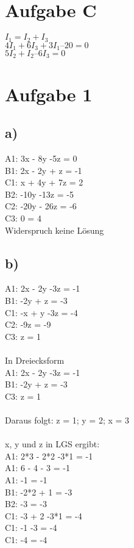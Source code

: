 \documentclass{article}
\begin{document}
	\section*{Aufgabe C}
	$I_1 = I_2 + I_3$ \\
	$4I_1 + 6I_3 + 3I_1 – 20 = 0$ \\
	$5I_2 + I_2 – 6I_3 = 0$ \\
	
	\section*{Aufgabe 1}
	\subsection*{a)}
	A1: 3x - 8y -5z = 0 \\
	B1: 2x - 2y + z = -1 \\
	C1: x + 4y + 7z = 2 \\
	B2: -10y -13z = -5 \\
	C2: -20y - 26z = -6 \\
	C3: 0 = 4 \\
	Widerspruch keine Lösung
	
	\subsection*{b)}
	A1: 2x - 2y -3z = -1 \\
	B1: -2y + z = -3\\
	C1: -x + y -3z = -4\\
	C2: -9z = -9 \\
	C3: z = 1 \\ \\
	In Dreiecksform \\
	A1: 2x - 2y -3z = -1 \\
	B1: -2y + z = -3\\
	C3: z = 1 \\ \\
	Daraus folgt: z = 1; y = 2; x = 3 \\ \\
	x, y und z in LGS ergibt: \\
	A1: 2*3 - 2*2 -3*1 = -1 \\
	A1: 6 - 4 - 3 = -1 \\
	A1: -1 = -1 \\
	B1: -2*2 + 1 = -3\\
	B2: -3 = -3 \\
	C1: -3 + 2 -3*1 = -4\\
	C1: -1 -3 = -4 \\
	C1: -4 = -4
\end{document}
